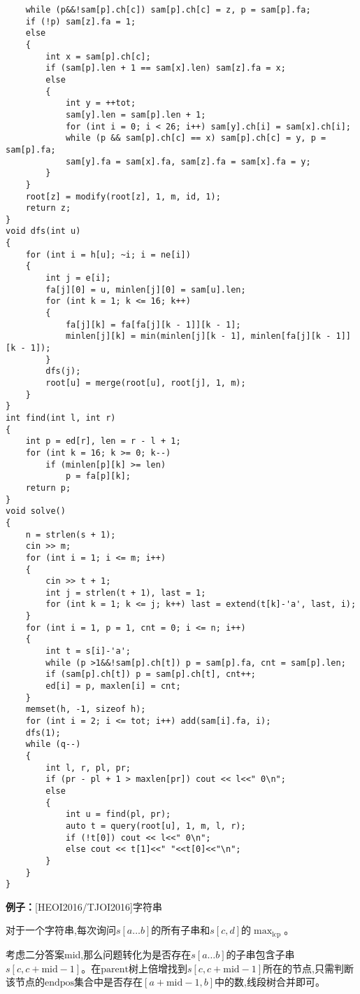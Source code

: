 \documentclass[a4paper, fontset=none]{ctexart}
\begin{document}
\begin{verbatim}
    while (p&&!sam[p].ch[c]) sam[p].ch[c] = z, p = sam[p].fa;
    if (!p) sam[z].fa = 1;
    else
    {
        int x = sam[p].ch[c];
        if (sam[p].len + 1 == sam[x].len) sam[z].fa = x;
        else
        {
            int y = ++tot;
            sam[y].len = sam[p].len + 1;
            for (int i = 0; i < 26; i++) sam[y].ch[i] = sam[x].ch[i];
            while (p && sam[p].ch[c] == x) sam[p].ch[c] = y, p = sam[p].fa;
            sam[y].fa = sam[x].fa, sam[z].fa = sam[x].fa = y;
        }
    }
    root[z] = modify(root[z], 1, m, id, 1);
    return z;
}
void dfs(int u)
{
    for (int i = h[u]; ~i; i = ne[i])
    {
        int j = e[i];
        fa[j][0] = u, minlen[j][0] = sam[u].len;
        for (int k = 1; k <= 16; k++)
        {
            fa[j][k] = fa[fa[j][k - 1]][k - 1];
            minlen[j][k] = min(minlen[j][k - 1], minlen[fa[j][k - 1]][k - 1]);
        }
        dfs(j);
        root[u] = merge(root[u], root[j], 1, m);
    }
}
int find(int l, int r)
{
    int p = ed[r], len = r - l + 1;
    for (int k = 16; k >= 0; k--)
        if (minlen[p][k] >= len)
            p = fa[p][k];
    return p;
}
void solve()
{
    n = strlen(s + 1);
    cin >> m;
    for (int i = 1; i <= m; i++)
    {
        cin >> t + 1;
        int j = strlen(t + 1), last = 1;
        for (int k = 1; k <= j; k++) last = extend(t[k]-'a', last, i);
    }
    for (int i = 1, p = 1, cnt = 0; i <= n; i++)
    {
        int t = s[i]-'a';
        while (p >1&&!sam[p].ch[t]) p = sam[p].fa, cnt = sam[p].len;
        if (sam[p].ch[t]) p = sam[p].ch[t], cnt++;
        ed[i] = p, maxlen[i] = cnt;
    }
    memset(h, -1, sizeof h);
    for (int i = 2; i <= tot; i++) add(sam[i].fa, i);
    dfs(1);
    while (q--)
    {
        int l, r, pl, pr;
        if (pr - pl + 1 > maxlen[pr]) cout << l<<" 0\n";
        else
        {
            int u = find(pl, pr);
            auto t = query(root[u], 1, m, l, r);
            if (!t[0]) cout << l<<" 0\n";
            else cout << t[1]<<" "<<t[0]<<"\n";
        }
    }
}
\end{verbatim}

\textbf{例子：}[HEOI2016/TJOI2016]字符串

对于一个字符串,每次询问$s[a\ldots b]$的所有子串和$s[c, d]$的$\max_{\text{lcp}}$。

考虑二分答案mid,那么问题转化为是否存在$s[a\ldots b]$的子串包含子串$s[c, c+\text{mid}-1]$。在$\text{parent}$树上倍增找到$s[c, c+\text{mid}-1]$所在的节点,只需判断该节点的$\text{endpos}$集合中是否存在$[a+\text{mid}-1, b]$中的数,线段树合并即可。
\end{document}
